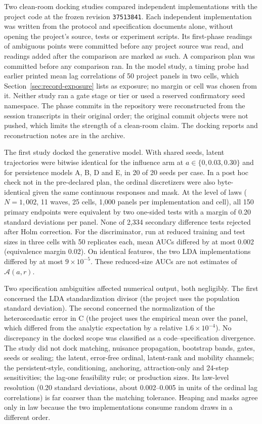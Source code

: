 Two clean-room docking studies compared independent implementations with the project code at the frozen revision \texttt{37513841}. Each independent implementation was written from the protocol and specification documents alone, without opening the project's source, tests or experiment scripts. Its first-phase readings of ambiguous points were committed before any project source was read, and readings added after the comparison are marked as such. A comparison plan was committed before any comparison ran. In the model study, a timing probe had earlier printed mean lag correlations of 50 project panels in two cells, which Section~\ref{sec:record-exposure} lists as exposure; no margin or cell was chosen from it. Neither study ran a gate stage or tier or used a reserved confirmatory seed namespace. The phase commits in the repository were reconstructed from the session transcripts in their original order; the original commit objects were not pushed, which limits the strength of a clean-room claim. The docking reports and reconstruction notes are in the archive.

The first study docked the generative model. With shared seeds, latent trajectories were bitwise identical for the influence arm at $a\in\{0,0.03,0.30\}$ and for persistence models A, B, D and E, in 20 of 20 seeds per case. In a post hoc check not in the pre-declared plan, the ordinal discretizers were also byte-identical given the same continuous responses and mask. At the level of laws ($N=1{,}002$, 11 waves, 25 cells, 1,000 panels per implementation and cell), all 150 primary endpoints were equivalent by two one-sided tests with a margin of 0.20 standard deviations per panel. None of 2,334 secondary difference tests rejected after Holm correction. For the discriminator, run at reduced training and test sizes in three cells with 50 replicates each, mean AUCs differed by at most 0.002 (equivalence margin 0.02). On identical features, the two LDA implementations differed by at most $9\times10^{-5}$. These reduced-size AUCs are not estimates of $\mathcal A(a,r)$.

Two specification ambiguities affected numerical output, both negligibly. The first concerned the LDA standardization divisor (the project uses the population standard deviation). The second concerned the normalization of the heteroscedastic error in C (the project uses the empirical mean over the panel, which differed from the analytic expectation by a relative $1.6\times10^{-4}$). No discrepancy in the docked scope was classified as a code--specification divergence. The study did not dock matching, nuisance propagation, bootstrap bands, gates, seeds or sealing; the latent, error-free ordinal, latent-rank and mobility channels; the persistent-style, conditioning, anchoring, attraction-only and 24-step sensitivities; the lag-one feasibility rule; or production sizes. Its law-level resolution (0.20 standard deviations, about 0.002--0.005 in units of the ordinal lag correlations) is far coarser than the matching tolerance. Heaping and masks agree only in law because the two implementations consume random draws in a different order.

